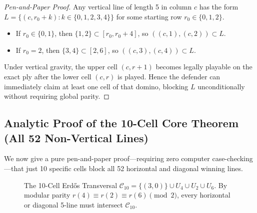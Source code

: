 \documentclass[11pt,reqno]{amsart}
\theoremstyle{plain}
\theoremstyle{definition}
\theoremstyle{remark}
\begin{document}
\begin{proof}[Pen-and-Paper Proof]
Any vertical line of length 5 in column $c$ has the form $L = \{(c, r_0 + k) : k \in \{0,1,2,3,4\}\}$ for some starting row $r_0 \in \{0, 1, 2\}$.
\begin{itemize}
    \item If $r_0 \in \{0, 1\}$, then $\{1, 2\} \subset [r_0, r_0+4]$, so $((c,1),(c,2)) \subset L$.
    \item If $r_0 = 2$, then $\{3, 4\} \subset [2, 6]$, so $((c,3),(c,4)) \subset L$.
\end{itemize}
Under vertical gravity, the upper cell $(c, r+1)$ becomes legally playable on the exact ply after the lower cell $(c, r)$ is played. Hence the defender can immediately claim at least one cell of that domino, blocking $L$ unconditionally without requiring global parity.
\end{proof}

\subsection{Analytic Proof of the 10-Cell Core Theorem (All 52 Non-Vertical Lines)}

We now give a pure pen-and-paper proof---requiring zero computer case-checking---that just 10 specific cells block all 52 horizontal and diagonal winning lines.

\begin{figure}[t]
\centering
{}
\caption{The 10-Cell Erd\H{o}s Transversal $\mathcal{C}_{10} = \{(3,0)\} \cup U_4 \cup U_2 \cup U_6$. By modular parity $r(4) \equiv r(2) \equiv r(6) \pmod 2$, every horizontal or diagonal 5-line must intersect $\mathcal{C}_{10}$.}
\label{fig:erdos_c10}
\end{figure}
\end{document}

